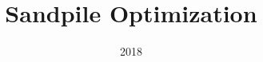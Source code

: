 \documentclass{beamer}
\title{Sandpile Optimization}
\date{2018}
\begin{document}
\frame{\titlepage}
\end{document}
